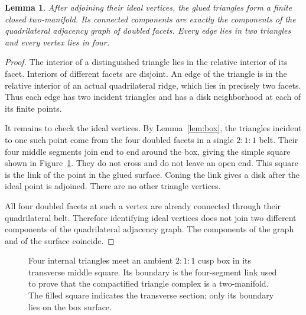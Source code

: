 \documentclass[11pt]{article}
\newtheorem{lemma}[theorem]{Lemma}
\theoremstyle{remark}
\begin{document}
\begin{lemma}\label{lem:surface}
After adjoining their ideal vertices, the glued triangles form a
finite closed two-manifold. Its connected components are exactly
the components of the quadrilateral adjacency graph of doubled facets.
Every edge lies in two triangles and every vertex lies in four.
\end{lemma}
\begin{proof}
The interior of a distinguished triangle lies in the relative
interior of its facet. Interiors of different facets are disjoint.
An edge of the triangle is in the relative interior of an actual
quadrilateral ridge, which lies in precisely two facets. Thus each
edge has two incident triangles and has a disk neighborhood at
each of its finite points.

It remains to check the ideal vertices. By Lemma~\ref{lem:box},
the triangles incident to one such point come from the four doubled
facets in a single $2:1:1$ belt. Their four middle segments join
end to end around the box, giving the simple square shown in
Figure~\ref{fig:belt}. They do not cross and do not leave an open
end. This square is the link of the point in the glued surface.
Coning the link gives a disk after the ideal point is adjoined.
There are no other triangle vertices.

All four doubled facets at such a vertex are already connected
through their quadrilateral belt. Therefore identifying ideal
vertices does not join two different components of the quadrilateral
adjacency graph. The components of the graph and of the surface
coincide.
\end{proof}

\begin{figure}[htbp]
\centering
{}
\caption{Four internal triangles meet an ambient $2:1:1$ cusp box
in its transverse middle square. Its boundary is the four-segment
link used to prove that the compactified triangle complex is a
two-manifold. The filled square indicates the transverse section;
only its boundary lies on the box surface.}
\label{fig:belt}
\end{figure}
\end{document}
